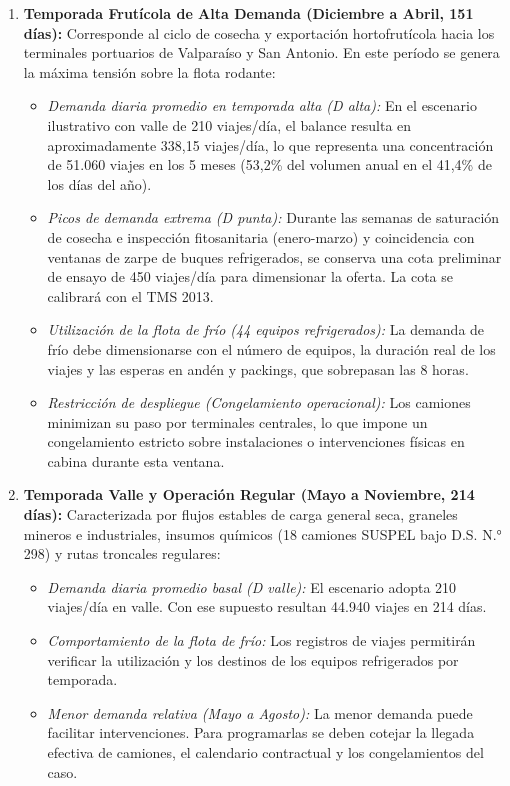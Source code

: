 \begin{enumerate}
  \item \textbf{Temporada Frutícola de Alta Demanda (Diciembre a Abril, 151 días):} Corresponde al ciclo de cosecha y exportación hortofrutícola hacia los terminales portuarios de Valparaíso y San Antonio. En este período se genera la máxima tensión sobre la flota rodante:
  \begin{itemize}
    \item \textit{Demanda diaria promedio en temporada alta (D alta):} En el escenario ilustrativo con valle de 210 viajes/día, el balance resulta en aproximadamente 338,15 viajes/día, lo que representa una concentración de 51.060 viajes en los 5 meses (53,2\% del volumen anual en el 41,4\% de los días del año).
    \item \textit{Picos de demanda extrema (D punta):} Durante las semanas de saturación de cosecha e inspección fitosanitaria (enero-marzo) y coincidencia con ventanas de zarpe de buques refrigerados, se conserva una cota preliminar de ensayo de 450 viajes/día para dimensionar la oferta. La cota se calibrará con el TMS 2013.
    \item \textit{Utilización de la flota de frío (44 equipos refrigerados):} La demanda de frío debe dimensionarse con el número de equipos, la duración real de los viajes y las esperas en andén y packings, que sobrepasan las 8 horas.
    \item \textit{Restricción de despliegue (Congelamiento operacional):} Los camiones minimizan su paso por terminales centrales, lo que impone un congelamiento estricto sobre instalaciones o intervenciones físicas en cabina durante esta ventana.
  \end{itemize}
  \item \textbf{Temporada Valle y Operación Regular (Mayo a Noviembre, 214 días):} Caracterizada por flujos estables de carga general seca, graneles mineros e industriales, insumos químicos (18 camiones SUSPEL bajo D.S. N.° 298) y rutas troncales regulares:
  \begin{itemize}
    \item \textit{Demanda diaria promedio basal (D valle):} El escenario adopta 210 viajes/día en valle. Con ese supuesto resultan 44.940 viajes en 214 días.
    \item \textit{Comportamiento de la flota de frío:} Los registros de viajes permitirán verificar la utilización y los destinos de los equipos refrigerados por temporada.
    \item \textit{Menor demanda relativa (Mayo a Agosto):} La menor demanda puede facilitar intervenciones. Para programarlas se deben cotejar la llegada efectiva de camiones, el calendario contractual y los congelamientos del caso.

\end{itemize}
\end{enumerate}
